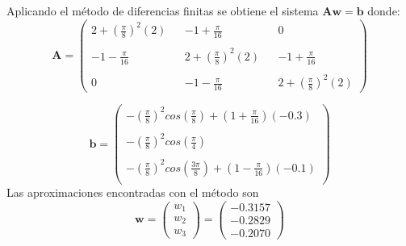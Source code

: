 \begin{frame}
Aplicando el método de diferencias finitas se obtiene el sistema $\mathbf{Aw=b}$ donde:
\begin{displaymath}
\mathbf{A}=\begin{pmatrix}
2+(\frac{\pi}{8})^2(2) && -1+\frac{\pi}{16} &&  0\\
\\
-1-\frac{\pi}{16} && 2+(\frac{\pi}{8})^2(2) && -1+\frac{\pi}{16}\\
\\
0&& -1-\frac{\pi}{16} && 2+(\frac{\pi}{8})^2(2)	
\end{pmatrix}
\end{displaymath}

\begin{displaymath}
\mathbf{b}=\begin{pmatrix}
-(\frac{\pi}{8})^2cos(\frac{\pi}{8})+(1+\frac{\pi}{16})(-0.3)\\
\\
-(\frac{\pi}{8})^2cos(\frac{\pi}{4})\\	
\\
-(\frac{\pi}{8})^2cos(\frac{3\pi}{8})+(1-\frac{\pi}{16})(-0.1)\\
\end{pmatrix}
\end{displaymath}
Las aproximaciones encontradas con el método son
\begin{displaymath}
\mathbf{w}=\begin{pmatrix}
w_1\\
w_2\\
w_3
\end{pmatrix}
=
\begin{pmatrix}
-0.3157\\
-0.2829\\
-0.2070
\end{pmatrix}
\end{displaymath}
\end{frame}

